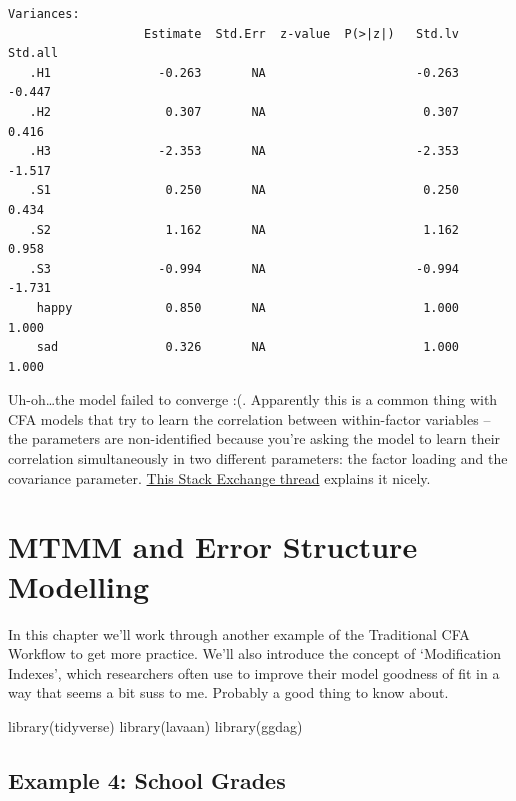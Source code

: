 \documentclass[
  letterpaper,
  DIV=11,
  numbers=noendperiod]{scrreprt}
\newenvironment{Shaded}{\begin{snugshade}}{\end{snugshade}}
\newcommand{\FunctionTok}[1]{\textcolor[rgb]{0.28,0.35,0.67}{#1}}
\newcommand{\NormalTok}[1]{\textcolor[rgb]{0.00,0.23,0.31}{#1}}
\begin{document}
\begin{verbatim}
Variances:
                   Estimate  Std.Err  z-value  P(>|z|)   Std.lv  Std.all
   .H1               -0.263       NA                     -0.263   -0.447
   .H2                0.307       NA                      0.307    0.416
   .H3               -2.353       NA                     -2.353   -1.517
   .S1                0.250       NA                      0.250    0.434
   .S2                1.162       NA                      1.162    0.958
   .S3               -0.994       NA                     -0.994   -1.731
    happy             0.850       NA                      1.000    1.000
    sad               0.326       NA                      1.000    1.000
\end{verbatim}

Uh-oh\ldots the model failed to converge :(. Apparently this is a common
thing with CFA models that try to learn the correlation between
within-factor variables -- the parameters are non-identified because
you're asking the model to learn their correlation simultaneously in two
different parameters: the factor loading and the covariance parameter.
\href{https://stackoverflow.com/questions/44114501/model-identification-in-lavaan-for-r}{This
Stack Exchange thread} explains it nicely.

\hypertarget{mtmm-and-error-structure-modelling}{%
\chapter{MTMM and Error Structure
Modelling}\label{mtmm-and-error-structure-modelling}}

In this chapter we'll work through another example of the Traditional
CFA Workflow to get more practice. We'll also introduce the concept of
`Modification Indexes', which researchers often use to improve their
model goodness of fit in a way that seems a bit suss to me. Probably a
good thing to know about.

\begin{Shaded}
\begin{Highlighting}[]
\FunctionTok{library}\NormalTok{(tidyverse)}
\FunctionTok{library}\NormalTok{(lavaan)}
\FunctionTok{library}\NormalTok{(ggdag)}
\end{Highlighting}
\end{Shaded}

\hypertarget{example-4-school-grades}{%
\section*{Example 4: School Grades}\label{example-4-school-grades}}
\end{document}
